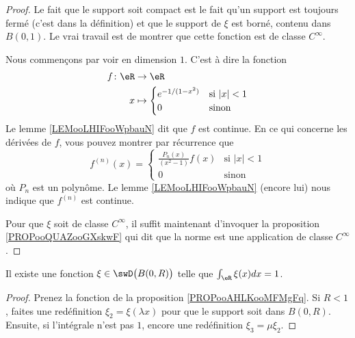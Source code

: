 \begin{proof}
	Le fait que le support soit compact est le fait qu'un support est toujours fermé (c'est dans la définition) et que le support de \( \xi\) est borné, contenu dans \( B(0,1)\). Le vrai travail est de montrer que cette fonction est de classe \(  C^{\infty}\).

	Nous commençons par voir en dimension \( 1\). C'est à dire la fonction
	\begin{equation}
		\begin{aligned}
			f\colon \eR & \to \eR                                     \\
			x           & \mapsto \begin{cases}
				                      e^{-1/(1-x^2)} & \text{si } | x |<1 \\
				                      0              & \text{sinon }
			                      \end{cases}
		\end{aligned}
	\end{equation}
	Le lemme \ref{LEMooLHIFooWpbauN} dit que \( f\) est continue. En ce qui concerne les dérivées de \( f\), vous pouvez montrer par récurrence que
	\begin{equation}
		f^{(n)}(x)=\begin{cases}
			\frac{ P_n(x) }{ (x^2-1) }f(x) & \text{si } | x |<1 \\
			0                              & \text{sinon }
		\end{cases}
	\end{equation}
	où \( P_n\) est un polynôme. Le lemme \ref{LEMooLHIFooWpbauN} (encore lui) nous indique que \( f^{(n)}\) est continue.

	Pour que \( \xi\) soit de classe \(  C^{\infty}\), il suffit maintenant d'invoquer la proposition \ref{PROPooQUAZooGXskwF} qui dit que la norme est une application de classe \(  C^{\infty}\).
\end{proof}

\begin{corollary}       \label{CORooHHZXooXmwGmC}
	Il existe une fonction \( \xi\in\swD\big( B(0,R) \big)\) telle que \( \int_{\eR}\xi(x)dx=1\).
\end{corollary}

\begin{proof}
	Prenez la fonction de la proposition \ref{PROPooAHLKooMFMgFq}. Si \( R<1\), faites une redéfinition \( \xi_2=\xi(\lambda x)\) pour que le support soit dans \( B(0,R)\). Ensuite, si l'intégrale n'est pas \( 1\), encore une redéfinition \( \xi_3=\mu\xi_2\).
\end{proof}


